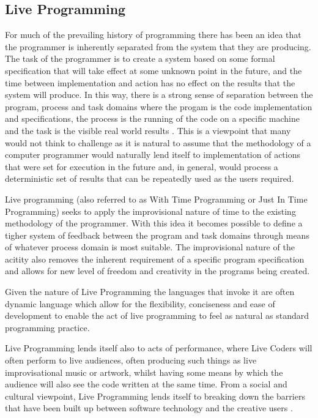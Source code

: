 \documentclass[11pt]{scrartcl}
\begin{document}
\subsection{Live Programming}
For much of the prevailing history of programming there has been an idea that 
the programmer is inherently separated from the system that they are 
producing. The task of the programmer is to create a system based on some 
formal specification that will take effect at some unknown point in the 
future, and the time between implementation and action has no effect on the 
results that the system will produce. In this way, there is a strong sense of 
separation between the program, process and task domains where the progam is 
the code implementation and specifications, the process is the running of the 
code on a specific machine and the task is the visible real world results
\cite{SG10}. This is a viewpoint that many would not think to challenge as it 
is natural to assume that the methodology of a computer programmer would 
naturally lend itself to implementation of actions that were set for execution 
in the future and, in general, would process a deterministic set of results 
that can be repeatedly used as the users required.

Live programming (also referred to as With Time Programming or Just In Time 
Programming) seeks to apply the improvisional nature of time to the existing 
methodology of the programmer. With this idea it becomes possible to define a 
tigher system of feedback between the program and task domains through means 
of whatever process domain is most suitable. The improvisional nature of the 
acitity also removes the inherent requirement of a specific program 
specification and allows for new level of freedom and creativity in the 
programs being created. 

Given the nature of Live Programming the languages that invoke it are often 
dynamic language which allow for the flexibility, conciseness and ease of 
development \cite{McD07} to enable the act of live programming to feel as 
natural as standard programming practice.

Live Programming lends itself also to acts of performance, where Live Coders 
will often perform to live audiences, often producing such things as live 
improvisational music or artwork, whilst having some means by which the 
audience will also see the code written at the same time. From a social and 
cultural viewpoint, Live Programming lends itself to breaking down the 
barriers that have been built up between software technology and the creative 
users \cite{McL13}.
\end{document}
